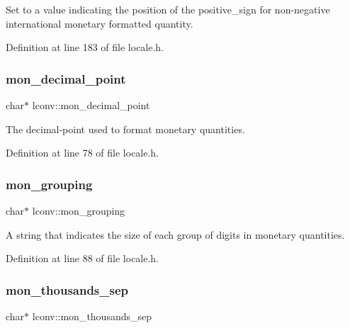 Set to a value indicating the position of the positive\+\_\+sign for non-\/negative international monetary formatted quantity. 



Definition at line 183 of file locale.\+h.

\mbox{\label{structlconv_a1aa08afe707c1d5d40b4d01369176480}} 
\subsubsection{\texorpdfstring{mon\_decimal\_point}{mon\_decimal\_point}}
{\footnotesize\ttfamily char$\ast$ lconv\+::mon\+\_\+decimal\+\_\+point}



The decimal-\/point used to format monetary quantities. 



Definition at line 78 of file locale.\+h.

\mbox{\label{structlconv_a12ecf5d2f7ceb0cfe0f66fd3200eef54}} 
\subsubsection{\texorpdfstring{mon\_grouping}{mon\_grouping}}
{\footnotesize\ttfamily char$\ast$ lconv\+::mon\+\_\+grouping}



A string that indicates the size of each group of digits in monetary quantities. 



Definition at line 88 of file locale.\+h.

\mbox{\label{structlconv_a4f04f4fd9ea670d21fc76fb5c77c032d}} 
\subsubsection{\texorpdfstring{mon\_thousands\_sep}{mon\_thousands\_sep}}
{\footnotesize\ttfamily char$\ast$ lconv\+::mon\+\_\+thousands\+\_\+sep}



